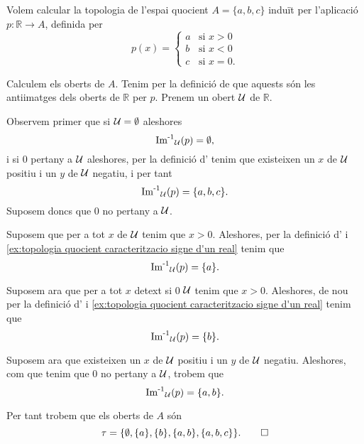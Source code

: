 \documentclass[../Apunts.tex]{subfiles}
\begin{document}
	\begin{example}
		Volem calcular la topologia de l'espai quocient \(A=\{a,b,c\}\) induït per l'aplicació \(p\colon\mathbb{R}\longrightarrow A\), definida per
		\begin{equation}
			\label{ex:topologia quocient caracteritzacio signe d'un real}
			p(x)=\begin{cases}
				a & \text{si }x>0 \\
				b & \text{si }x<0 \\
				c & \text{si }x=0.
			\end{cases}
		\end{equation}
		\begin{solution}
			Calculem els oberts de \(A\). Tenim per la definició de  que aquests són les antiimatges dels oberts de \(\mathbb{R}\) per \(p\). Prenem un obert \(\mathcal{U}\) de \(\mathbb{R}\).
			
			Observem primer que si \(\mathcal{U}=\emptyset\) aleshores
			\[\operatorname{\operatorname{Im}^{-1}}_{\mathcal{U}}(p)=\emptyset,\]
			i si \(0\) pertany a \(\mathcal{U}\) aleshores, per la definició d' tenim que existeixen un \(x\) de \(\mathcal{U}\) positiu i un \(y\) de \(\mathcal{U}\) negatiu, i per tant
			\[\operatorname{\operatorname{Im}^{-1}}_{\mathcal{U}}(p)=\{a,b,c\}.\]
			Suposem doncs que \(0\) no pertany a \(\mathcal{U}\).
			
			Suposem que per a tot \(x\) de \(\mathcal{U}\) tenim que \(x>0\). Aleshores, per la definició d' i \eqref{ex:topologia quocient caracteritzacio signe d'un real} tenim que
			\[\operatorname{\operatorname{Im}^{-1}}_{\mathcal{U}}(p)=\{a\}.\]
			
			Suposem ara que per a tot \(x\) detext{ si }0 \(\mathcal{U}\) tenim que \(x>0\). Aleshores, de nou per la definició d' i \eqref{ex:topologia quocient caracteritzacio signe d'un real} tenim que
			\[\operatorname{\operatorname{Im}^{-1}}_{\mathcal{U}}(p)=\{b\}.\]
			
			Suposem ara que existeixen un \(x\) de \(\mathcal{U}\) positiu i un \(y\) de \(\mathcal{U}\) negatiu. Aleshores, com que tenim que \(0\) no pertany a \(\mathcal{U}\), trobem que
			\[\operatorname{\operatorname{Im}^{-1}}_{\mathcal{U}}(p)=\{a,b\}.\]
			
			Per tant trobem que els oberts de \(A\) són
			\[\tau=\{\emptyset,\{a\},\{b\},\{a,b\},\{a,b,c\}\}.\qedhere\]
		\end{solution}
	\end{example}
\end{document}
